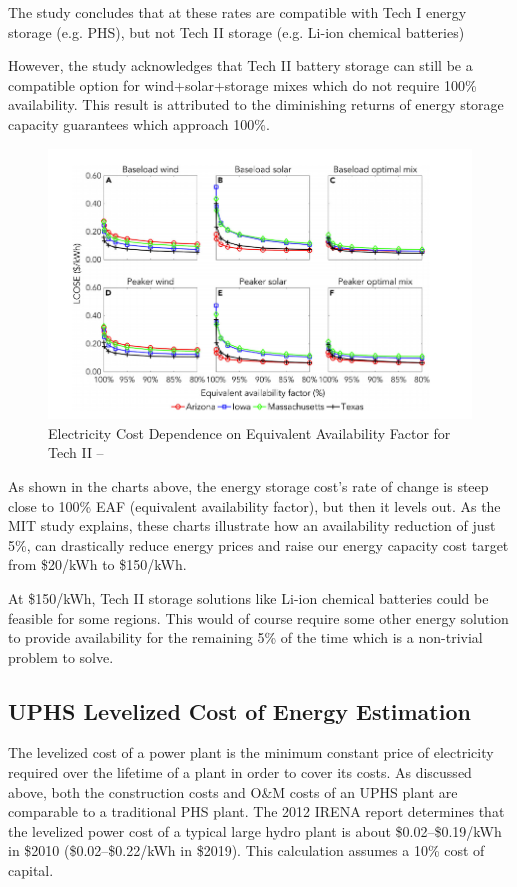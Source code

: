 \documentclass[hidelinks,12pt,a4paper]{article}
\begin{document}
The study concludes that at these rates are compatible with Tech I energy storage (e.g. PHS), but not Tech II storage (e.g. Li-ion chemical batteries)

However, the study acknowledges that Tech II battery storage can still be a compatible option for wind+solar+storage mixes which do not require 100\% availability. This result is attributed to the diminishing returns of energy storage capacity guarantees which approach 100\%.

\begin{figure}[ht!]
    \centering
    \includegraphics[width=1\textwidth]{cost-as-function-of-availability-factor.png}
    \caption{Electricity Cost Dependence on Equivalent Availability Factor for Tech II -- \cite{StorageRequirementsAndCostsOfShapingRenewableEnergy}}
\end{figure}
\FloatBarrier

As shown in the charts above, the energy storage cost's rate of change is steep close to 100\% EAF (equivalent availability factor), but then it levels out. As the MIT study explains, these charts illustrate how an availability reduction of just 5\%, can drastically reduce energy prices and raise our energy capacity cost target from \$20/kWh to \$150/kWh.

At \$150/kWh, Tech II storage solutions like Li-ion chemical batteries could be feasible for some regions. This would of course require some other energy solution to provide availability for the remaining 5\% of the time which is a non-trivial problem to solve.

\subsection{UPHS Levelized Cost of Energy Estimation}
The levelized cost of a power plant is the minimum constant price of electricity required over the lifetime of a plant in order to cover its costs. As discussed above, both the construction costs and O\&M costs of an UPHS plant are comparable to a traditional PHS plant. The 2012 IRENA report determines that the levelized power cost of a typical large hydro plant is about \$0.02–\$0.19/kWh in \$2010 (\$0.02–\$0.22/kWh in \$2019). This calculation assumes a 10\% cost of capital.
\end{document}
